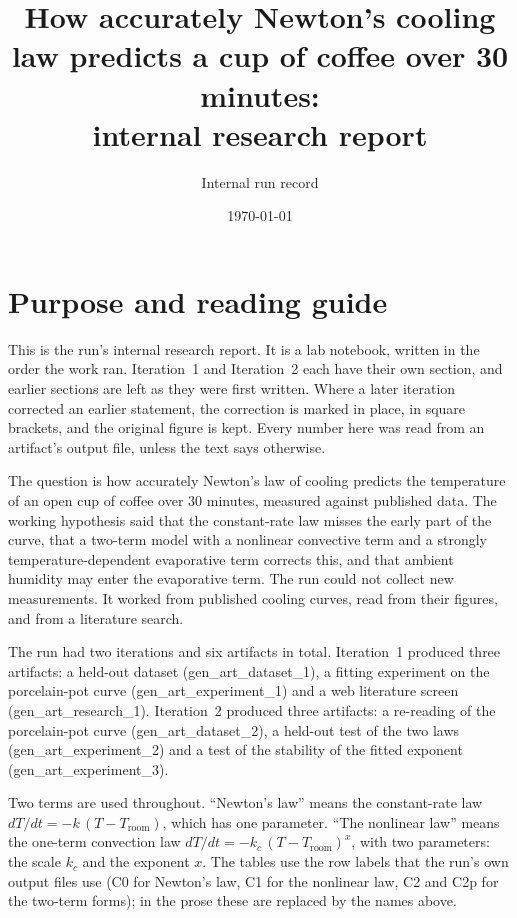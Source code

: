 \documentclass[11pt,letterpaper]{article}
\title{How accurately Newton's cooling law predicts a cup of coffee over 30 minutes:\\
internal research report}
\author{Internal run record}
\date{\today}
\begin{document}
\maketitle
\tableofcontents

\section{Purpose and reading guide}

This is the run's internal research report. It is a lab notebook, written in the order the work ran. Iteration~1 and Iteration~2 each have their own section, and earlier sections are left as they were first written. Where a later iteration corrected an earlier statement, the correction is marked in place, in square brackets, and the original figure is kept. Every number here was read from an artifact's output file, unless the text says otherwise.

The question is how accurately Newton's law of cooling predicts the temperature of an open cup of coffee over 30 minutes, measured against published data. The working hypothesis said that the constant-rate law misses the early part of the curve, that a two-term model with a nonlinear convective term and a strongly temperature-dependent evaporative term corrects this, and that ambient humidity may enter the evaporative term. The run could not collect new measurements. It worked from published cooling curves, read from their figures, and from a literature search.

The run had two iterations and six artifacts in total. Iteration~1 produced three artifacts: a held-out dataset (gen\_art\_dataset\_1), a fitting experiment on the porcelain-pot curve (gen\_art\_experiment\_1) and a web literature screen (gen\_art\_research\_1). Iteration~2 produced three artifacts: a re-reading of the porcelain-pot curve (gen\_art\_dataset\_2), a held-out test of the two laws (gen\_art\_experiment\_2) and a test of the stability of the fitted exponent (gen\_art\_experiment\_3).

Two terms are used throughout. ``Newton's law'' means the constant-rate law $dT/dt = -k\,(T - T_{\mathrm{room}})$, which has one parameter. ``The nonlinear law'' means the one-term convection law $dT/dt = -k_c\,(T - T_{\mathrm{room}})^{x}$, with two parameters: the scale $k_c$ and the exponent $x$. The tables use the row labels that the run's own output files use (C0 for Newton's law, C1 for the nonlinear law, C2 and C2p for the two-term forms); in the prose these are replaced by the names above.
\end{document}
